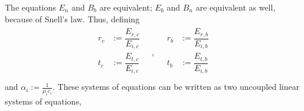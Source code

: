 \documentclass[letterpaper,10pt,english]{jupyterBook}
\begin{document}
\sphinxAtStartPar
The equations \(E_n\) and \(B_b\) are equivalent; \(E_b\) and \(B_n\) are equivalent as well, because of Snell’s law. Thus, defining
\begin{equation*}
\begin{split}
\begin{aligned}
  r_c & := \dfrac{E_{r,c}}{E_{i,c}} \\
  t_c & := \dfrac{E_{t,c}}{E_{i,c}} \\
\end{aligned}
\quad , \quad
\begin{aligned}
  r_b & := \dfrac{E_{r,b}}{E_{i,b}} \\
  t_b & := \dfrac{E_{t,b}}{E_{i,b}} \\
\end{aligned}
\end{split}
\end{equation*}
\sphinxAtStartPar
and \(\alpha_i := \frac{1}{\mu_i c_i}\). These systems of equations can be written as two uncoupled linear systems of equations,
\end{document}
